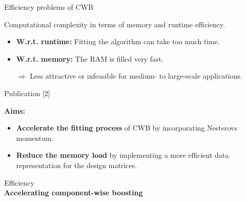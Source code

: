 \documentclass[t,10pt]{beamer}
\newcommand{\fSlide}[2]{
\begin{frame}[plain]{}%
  \vspace{4cm}%
  \Large #1\\[0.2cm]%
  {\LARGE\textbf{#2}}%
	\addtocounter{framenumber}{-1}%
\end{frame}%
}
\begin{document}
\begin{frame}{Efficiency problems of CWB}

  Computational complexity in terms of memory and runtime efficiency.
  \begin{itemize}
    \item \textbf{W.r.t. runtime:} Fitting the algorithm can take too much time.
    \item \textbf{W.r.t. memory:} The RAM is filled very fast.
  \end{itemize}
  \begin{itemize}
    \item[$\Rightarrow$] Less attractive or infeasible for medium- to large-scale applications.
  \end{itemize}
\end{frame}

\begin{frame}{Publication [2]}
  \vspace{-0.2cm}
  \begin{figure}
    \centering
  \end{figure}
  \vspace{-0.4cm}

  \textbf{Aims:}
  \begin{itemize}
    \item
      \textbf{Accelerate the fitting process} of CWB by incorporating Nesterovs momentum.
    \item
      \textbf{Reduce the memory load} by implementing a more efficient data representation for the design matrices.
  \end{itemize}
\end{frame}

\fSlide{Efficiency}{Accelerating component-wise boosting}
\end{document}
